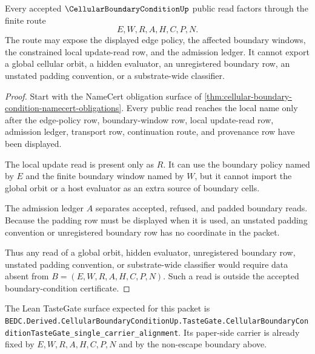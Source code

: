\begin{theorem}
\label{thm:cellular-boundary-condition-nonescape-boundary}
Every accepted $\CellularBoundaryConditionUp$ public read factors through the finite route
$$
E,W,R,A,H,C,P,N.
$$
The route may expose the displayed edge policy, the affected boundary windows, the constrained local update-read row, and the admission ledger. It cannot export a global cellular orbit, a hidden evaluator, an unregistered boundary row, an unstated padding convention, or a substrate-wide classifier.
\end{theorem}
\begin{proof}
Start with the NameCert obligation surface of \autoref{thm:cellular-boundary-condition-namecert-obligations}. Every public read reaches the local name only after the edge-policy row, boundary-window row, local update-read row, admission ledger, transport row, continuation route, and provenance row have been displayed.

The local update read is present only as $R$. It can use the boundary policy named by $E$ and the finite boundary window named by $W$, but it cannot import the global orbit or a host evaluator as an extra source of boundary cells.

The admission ledger $A$ separates accepted, refused, and padded boundary reads. Because the padding row must be displayed when it is used, an unstated padding convention or unregistered boundary row has no coordinate in the packet.

Thus any read of a global orbit, hidden evaluator, unregistered boundary row, unstated padding convention, or substrate-wide classifier would require data absent from $B=(E,W,R,A,H,C,P,N)$. Such a read is outside the accepted boundary-condition certificate.
\end{proof}

The Lean TasteGate surface expected for this packet is \texttt{BEDC.Derived.CellularBoundaryConditionUp.TasteGate.CellularBoundaryConditionTasteGate\_single\_carrier\_alignment}. Its paper-side carrier is already fixed by $E,W,R,A,H,C,P,N$ and by the non-escape boundary above.



